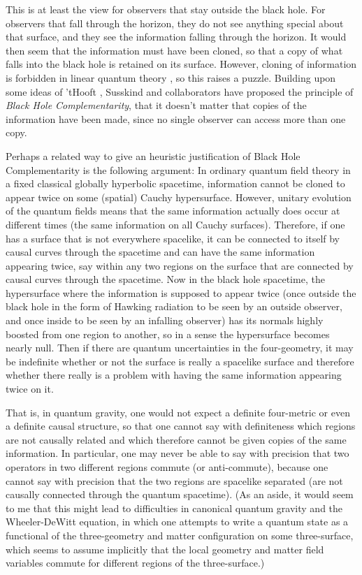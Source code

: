 \documentclass[12pt]{article} \usepackage{latexsym}
\begin{document}
This is at least the view for observers that stay outside the black
hole.  For observers that fall through the horizon, they do not see
anything special about that surface, and they see the information
falling through the horizon.  It would then seem that the information
must have been cloned, so that a copy of what falls into the black
hole is retained on its surface.  However, cloning of information is
forbidden in linear quantum theory \cite{clone}, so this raises a
puzzle.  Building upon some ideas of 'tHooft
\cite{tHooft,'tHooft2,'tHooft3}, Susskind and collaborators
\cite{STU,Suss,ST,Suss2,LSU,LPSTU,SU} have proposed the principle of
{\it Black Hole Complementarity}, that it doesn't matter that copies
of the information have been made, since no single observer can access
more than one copy.

Perhaps a related way to give an heuristic justification of Black Hole
Complementarity is the following argument:  In ordinary quantum field
theory in a fixed classical globally hyperbolic spacetime, information
cannot be cloned to appear twice on some (spatial) Cauchy
hypersurface.  However, unitary evolution of the quantum fields means
that the same information actually does occur at different times (the
same information on all Cauchy surfaces).  Therefore, if one has a
surface that is not everywhere spacelike, it can be connected to
itself by causal curves through the spacetime and can have the same
information appearing twice, say within any two regions on the surface
that are connected by causal curves through the spacetime.  Now in the
black hole spacetime, the hypersurface where the information is
supposed to appear twice (once outside the black hole in the form of
Hawking radiation to be seen by an outside observer, and once inside
to be seen by an infalling observer) has its normals highly boosted
from one region to another, so in a sense the hypersurface becomes
nearly null.  Then if there are quantum uncertainties in the
four-geometry, it may be indefinite whether or not the surface is
really a spacelike surface and therefore whether there really is a
problem with having the same information appearing twice on it.

That is, in quantum gravity, one would not expect a definite
four-metric or even a definite causal structure, so that one cannot
say with definiteness which regions are not causally related and which
therefore cannot be given copies of the same information.  In
particular, one may never be able to say with precision that two
operators in two different regions commute (or anti-commute), because
one cannot say with precision that the two regions are spacelike
separated (are not causally connected through the quantum spacetime).
(As an aside, it would seem to me that this might lead to difficulties
in canonical quantum gravity and the Wheeler-DeWitt equation, in which
one attempts to write a quantum state as a functional of the
three-geometry and matter configuration on some three-surface, which
seems to assume implicitly that the local geometry and matter field
variables commute for different regions of the three-surface.)
\end{document}
